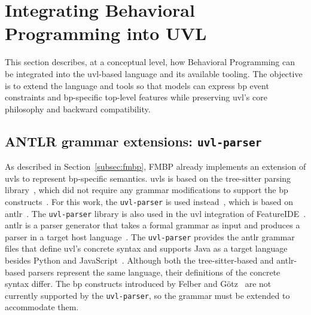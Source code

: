 \section{Integrating Behavioral Programming into UVL}
\label{sec:concept_bp_integration}

This section describes, at a conceptual level, how Behavioral Programming can be integrated into the \gls{uvl}-based language and its available tooling.
The objective is to extend the language and tools so that models can express \gls{bp} event constraints and \gls{bp}-specific top-level features while preserving \gls{uvl}'s core philosophy and backward compatibility.

\subsection{ANTLR grammar extensions: \texttt{uvl-parser}}
\label{subsec:concept_bp_integration_antlr}

As described in Section~\ref{subsec:fmbp}, FMBP already implements an extension of \gls{uvls} to represent \gls{bp}-specific semantics.
\gls{uvls} is based on the tree-sitter parsing library~\cite{loth_uvls_2023}, which did not require any grammar modifications to support the \gls{bp} constructs~\cite{felber_comprehensible_2025, felber_tfelbruvl-bp-lsp_2025}.
For this work, the \texttt{uvl-parser} is used instead~\cite{sundermann_uvlparser_2023, noauthor_universal-variability-languageuvl-parser_2026}, which is based on \gls{antlr}~\cite{noauthor_antlrantlr4_2026}.
The \texttt{uvl-parser} library is also used in the \gls{uvl} integration of FeatureIDE~\cite{noauthor_featureidefeatureide_2026}.
\gls{antlr} is a parser generator that takes a formal grammar as input and produces a parser in a target host language~\cite{parr_definitive_2013}.
The \texttt{uvl-parser} provides the \gls{antlr} grammar files that define \gls{uvl}'s concrete syntax and supports Java as a target language besides Python and JavaScript~\cite{noauthor_universal-variability-languageuvl-parser_2026}.
Although both the tree-sitter-based and \gls{antlr}-based parsers represent the same language, their definitions of the concrete syntax differ.
The \gls{bp} constructs introduced by Felber and Götz~\cite{felber_behavioral_2025} are not currently supported by the \texttt{uvl-parser}, so the grammar must be extended to accommodate them.

